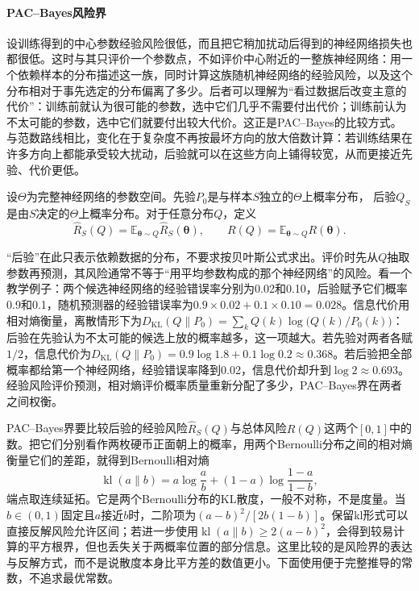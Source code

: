 \paragraph{PAC--Bayes风险界}

设训练得到的中心参数经验风险很低，而且把它稍加扰动后得到的神经网络损失也都很低。这时与其只评价一个参数点，不如评价中心附近的一整族神经网络：用一个依赖样本的分布描述这一族，同时计算这族随机神经网络的经验风险，以及这个分布相对于事先选定的分布偏离了多少。后者可以理解为“看过数据后改变主意的代价”：训练前就认为很可能的参数，选中它们几乎不需要付出代价；训练前认为不太可能的参数，选中它们就要付出较大代价。这正是PAC--Bayes的比较方式。与范数路线相比，变化在于复杂度不再按最坏方向的放大倍数计算：若训练结果在许多方向上都能承受较大扰动，后验就可以在这些方向上铺得较宽，从而更接近先验、代价更低。

\begin{definition}
\label{def:pac-bayes-distributions}
设$\Theta$为完整神经网络的参数空间。先验$P_0$是与样本$S$独立的$\Theta$上概率分布，
后验$Q_S$是由$S$决定的$\Theta$上概率分布。对于任意分布$Q$，定义
\[
 \hat R_S(Q)=\mathbb E_{\bm\theta\sim Q}\hat R_S(\bm\theta),
 \qquad R(Q)=\mathbb E_{\bm\theta\sim Q}R(\bm\theta).
\]
\end{definition}

“后验”在此只表示依赖数据的分布，不要求按贝叶斯公式求出。评价时先从$Q$抽取参数再预测，其风险通常不等于“用平均参数构成的那个神经网络”的风险。看一个教学例子：两个候选神经网络的经验错误率分别为0.02和0.10，后验赋予它们概率0.9和0.1，随机预测器的经验错误率为$0.9\times0.02+0.1\times0.10=0.028$。信息代价用相对熵衡量，离散情形下为$D_{\mathrm{KL}}(Q\|P_0)=\sum_kQ(k)\log\bigl(Q(k)/P_0(k)\bigr)$：后验在先验认为不太可能的候选上放的概率越多，这一项越大。若先验对两者各赋$1/2$，信息代价为$D_{\mathrm{KL}}(Q\|P_0)=0.9\log1.8+0.1\log0.2\approx0.368$。若后验把全部概率都给第一个神经网络，经验错误率降到0.02，信息代价却升到$\log2\approx0.693$。经验风险评价预测，相对熵评价概率质量重新分配了多少，PAC--Bayes界在两者之间权衡。

PAC--Bayes界要比较后验的经验风险$\hat R_S(Q)$与总体风险$R(Q)$这两个$[0,1]$中的数。把它们分别看作两枚硬币正面朝上的概率，用两个Bernoulli分布之间的相对熵衡量它们的差距，就得到Bernoulli相对熵
\[
 \operatorname{kl}(a\|b)=a\log\frac ab+(1-a)\log\frac{1-a}{1-b},
\]
端点取连续延拓。它是两个Bernoulli分布的KL散度，一般不对称，不是度量。当$b\in(0,1)$固定且$a$接近$b$时，二阶项为$(a-b)^2/[2b(1-b)]$。保留kl形式可以直接反解风险允许区间；若进一步使用$\operatorname{kl}(a\|b)\geq2(a-b)^2$，会得到较易计算的平方根界，但也丢失关于两概率位置的部分信息。这里比较的是风险界的表达与反解方式，而不是说散度本身比平方差的数值更小。下面使用便于完整推导的常数，不追求最优常数。

